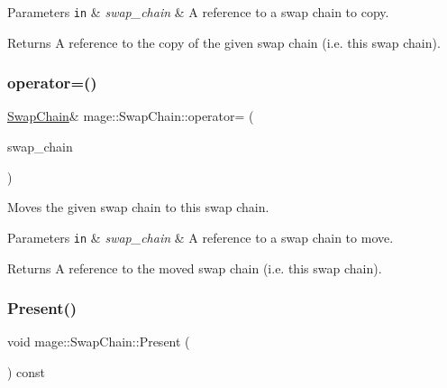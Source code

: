 \begin{DoxyParams}[1]{Parameters}
\mbox{\tt in}  & {\em swap\+\_\+chain} & A reference to a swap chain to copy. \\
\hline
\end{DoxyParams}
\begin{DoxyReturn}{Returns}
A reference to the copy of the given swap chain (i.\+e. this swap chain). 
\end{DoxyReturn}
\hypertarget{classmage_1_1_swap_chain_a4335d4e0869c43a66bfce5f2d0d6f34c}{}\label{classmage_1_1_swap_chain_a4335d4e0869c43a66bfce5f2d0d6f34c} 
\subsubsection{\texorpdfstring{operator=()}{operator=()}\hspace{0.1cm}{\footnotesize\ttfamily [2/2]}}
{\footnotesize\ttfamily \hyperlink{classmage_1_1_swap_chain}{Swap\+Chain}\& mage\+::\+Swap\+Chain\+::operator= (\begin{DoxyParamCaption}\item[{\hyperlink{classmage_1_1_swap_chain}{Swap\+Chain} \&\&}]{swap\+\_\+chain }\end{DoxyParamCaption})\hspace{0.3cm}{\ttfamily [delete]}}

Moves the given swap chain to this swap chain.


\begin{DoxyParams}[1]{Parameters}
\mbox{\tt in}  & {\em swap\+\_\+chain} & A reference to a swap chain to move. \\
\hline
\end{DoxyParams}
\begin{DoxyReturn}{Returns}
A reference to the moved swap chain (i.\+e. this swap chain). 
\end{DoxyReturn}
\hypertarget{classmage_1_1_swap_chain_a477d34baf72331aeff23f32cd34518b6}{}\label{classmage_1_1_swap_chain_a477d34baf72331aeff23f32cd34518b6} 
\subsubsection{\texorpdfstring{Present()}{Present()}}
{\footnotesize\ttfamily void mage\+::\+Swap\+Chain\+::\+Present (\begin{DoxyParamCaption}{ }\end{DoxyParamCaption}) const\hspace{0.3cm}{\ttfamily [noexcept]}}


